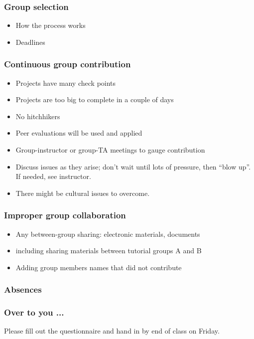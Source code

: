 \begin{frame}\frametitle{Group selection}
	\begin{itemize}
		\item	How the process works
		\item	Deadlines
	\end{itemize}
\end{frame}

\begin{frame}\frametitle{Continuous group contribution}
	\begin{itemize}
		\item	Projects have many check points
		\item	Projects are too big to complete in a couple of days
		\item	No hitchhikers
		\item	Peer evaluations will be used and applied
		\item	Group-instructor or group-TA meetings to gauge contribution
		\item	Discuss issues as they arise; don't wait until lots of pressure, then ``blow up''.  If needed, see instructor.
		\item	There might be cultural issues to overcome.
	\end{itemize}
\end{frame}

\begin{frame}\frametitle{Improper group collaboration}
	\begin{itemize}
		\item	Any between-group sharing: electronic materials, documents
		\item	including sharing materials between tutorial groups A and B
		\item	Adding group members names that did not contribute
	\end{itemize}
\end{frame}

\begin{frame}\frametitle{Absences}
\end{frame}

\begin{frame}\frametitle{Over to you ...}
	Please fill out the questionnaire and hand in by end of class on Friday.
\end{frame}
